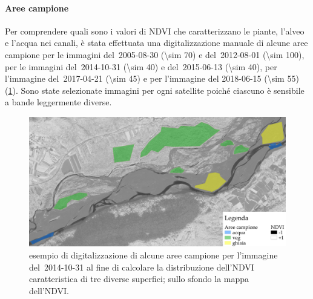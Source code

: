 \paragraph{Aree campione}
Per comprendere quali sono i valori di NDVI che caratterizzano le piante, l'alveo e l'acqua nei canali, è stata effettuata una digitalizzazione manuale di alcune aree campione per le immagini \AST{} del~2005-08-30 (\num{\sim 70}) e del~2012-08-01 (\num{\sim 100}), per le immagini \Pl{} del~2014-10-31 (\num{\sim 40}) e del~2015-06-13 (\num{\sim 40}), per l'immagine \Se{} del~2017-04-21 (\num{\sim 45}) e per l'immagine \WV{} del 2018-06-15 (\num{\sim 55}) (\cref{fig:esempio-aree-campione}).
	Sono state selezionate immagini per ogni satellite poiché ciascuno è sensibile a bande leggermente diverse. 
	\begin{figure}
		\centering
		\includegraphics[width=\textwidth]{files/esempio_aree_campione_2014_10_31.jpeg}
		\caption[esempio di aree campione per calcolare la distribuzione dell'NDVI]{esempio di digitalizzazione di alcune aree campione per l'immagine \Pl{} del~2014-10-31 al fine di calcolare la distribuzione dell'NDVI caratteristica di tre diverse superfici; sullo sfondo la mappa dell'NDVI.}
		\label{fig:esempio-aree-campione}
	\end{figure}
